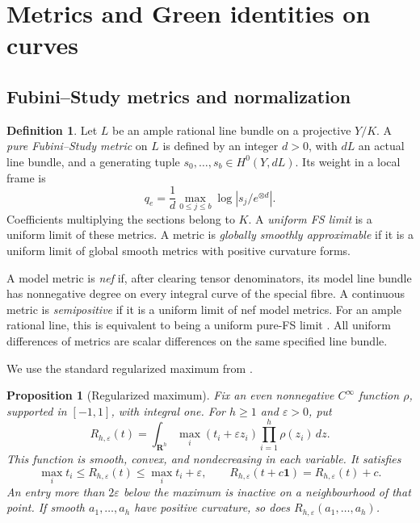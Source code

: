 \documentclass[11pt]{amsart}
\newtheorem{proposition}[theorem]{Proposition}
\theoremstyle{definition}
\newtheorem{definition}[theorem]{Definition}
\theoremstyle{remark}
\numberwithin{equation}{section}
\newcommand{\R}{\mathbf R}
\begin{document}
\section{Metrics and Green identities on curves}\label{sec:metrics-curves}

\subsection{Fubini--Study metrics and normalization}
\label{app:maxima}%
\begin{definition}\label{def:fs}
Let \(L\) be an ample rational line bundle on a projective \(Y/K\).
A \emph{pure Fubini--Study metric} on \(L\) is defined by an integer
\(d>0\), with \(dL\) an actual line bundle, and a generating tuple
\(s_0,\ldots,s_b\in H^0(Y,dL)\). Its weight in a local frame is
\[
 q_e=\frac1d\max_{0\leq j\leq b}\log|s_j/e^{\otimes d}|.
\]
Coefficients multiplying the sections belong to \(K\). A
\emph{uniform FS limit} is a uniform limit of these metrics.
A metric is \emph{globally smoothly approximable} if it is a uniform
limit of global smooth metrics with positive curvature forms.
\end{definition}

A model metric is \emph{nef} if, after clearing tensor denominators,
its model line bundle has nonnegative degree on every integral curve
of the special fibre. A continuous metric is \emph{semipositive}
if it is a uniform limit of nef model metrics. For an ample rational
line, this is equivalent to being a uniform pure-FS limit
\cite[Corollary 7.6 and Theorem 7.8]{BE}. All uniform differences of
metrics are scalar differences on the same specified line bundle.

We use the standard regularized maximum from
\cite[proof of Proposition 6.3.2]{CLD12}.

\begin{proposition}[Regularized maximum]\label{prop:regularized-max}
Fix an even nonnegative \(C^\infty\) function \(\rho\), supported
in \([-1,1]\), with integral one. For \(h\geq1\) and
\(\varepsilon>0\), put
\[
 R_{h,\varepsilon}(t)
 =\int_{\R^h}\max_i(t_i+\varepsilon z_i)
                    \prod_{i=1}^h\rho(z_i)\,dz.
\]
This function is smooth, convex, and nondecreasing in each variable.
It satisfies
\[
 \max_i t_i\leq R_{h,\varepsilon}(t)\leq\max_i t_i+\varepsilon,
 \qquad
 R_{h,\varepsilon}(t+c\mathbf1)=R_{h,\varepsilon}(t)+c.
\]
An entry more than \(2\varepsilon\) below the maximum is inactive
on a neighbourhood of that point. If smooth \(a_1,\ldots,a_h\)
have positive curvature, so does \(R_{h,\varepsilon}(a_1,\ldots,a_h)\).
\end{proposition}
\end{document}
